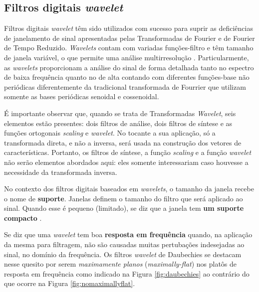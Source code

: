 		\subsection{Filtros digitais \textit{wavelet}}
			\par Filtros digitais \textit{wavelet} têm sido utilizados com sucesso para suprir as deficiências de janelamento de sinal apresentadas pelas Transformadas de Fourier e de Fourier de Tempo Reduzido. \textit{Wavelets} contam com variadas funções-filtro e têm tamanho de janela variável, o que permite uma análise multirresolução \cite{Rod5254905}. Particularmente, as \textit{wavelets} proporcionam a análise do sinal de forma detalhada tanto no espectro de baixa frequência quanto no de alta contando com diferentes funções-base não periódicas diferentemente da tradicional transformada de Fourrier que utilizam somente as bases periódicas senoidal e cossenoidal.
			
			\par É importante observar que, quando se trata de Transformadas \textit{Wavelet}, seis elementos estão presentes: dois filtros de análise, dois filtros de síntese e as funções ortogonais \textit{scaling} e \textit{wavelet}. No tocante a sua aplicação, só a transformada direta, e não a inversa, será usada na construção dos vetores de características. Portanto, os filtros de síntese, a função \textit{scaling} e a função \textit{wavelet} não serão elementos abordados aqui: eles somente interessariam caso houvesse a necessidade da transformada inversa.

			\par No contexto dos filtros digitais baseados em \textit{wavelets}, o tamanho da janela recebe o nome de \textbf{suporte}. Janelas definem o tamanho do filtro que será aplicado ao sinal. Quando esse é pequeno (limitado), se diz que a janela tem \textbf{um suporte compacto} \cite{robi2003}.
		
			\par Se diz que uma \textit{wavelet} tem boa \textbf{resposta em frequência} quando, na aplicação da mesma para filtragem, não são causadas muitas pertubações indesejadas ao sinal, no domínio da frequência. Os filtros \textit{wavelet} de Daubechies \cite{daubechies1992ten} se destacam nesse quesito por serem \textit{maximamente planos} (\textit{maximally-flat}) \cite{butterworth1930} \cite{bianchi2007electronic} nos platôs de resposta em frequência como indicado na Figura \ref{fig:daubechies} ao contrário do que ocorre na Figura \ref{fig:nomaximallyflat}.

